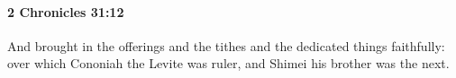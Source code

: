 
		\paragraph{2 Chronicles 31:12} %
			\label{2CHRONICLES-31-12}

			And brought in the offerings and the tithes and the dedicated things faithfully: over which Cononiah the Levite was ruler, and Shimei his brother was the next.


